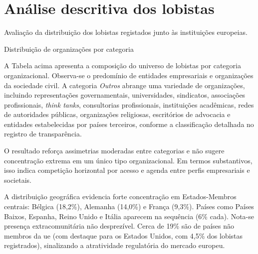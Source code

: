 \section{Análise descritiva dos lobistas}
\label{sec:resultados_descritica_lobistas}
Avaliação da distribuição dos lobistas registados junto às instituições europeias.

\begin{table}[!htbp]
\centering
\caption{Distribuição de organizações por categoria}

\end{table}

A Tabela acima apresenta a composição do universo de lobistas por categoria organizacional. Observa-se o predomínio de entidades empresariais e organizações da sociedade civil. A categoria \textit{Outros} abrange uma variedade de organizações, incluindo representações governamentais, universidades, sindicatos, associações profissionais, \textit{think tanks}, consultorias profissionais, instituições acadêmicas, redes de autoridades públicas, organizações religiosas, escritórios de advocacia e entidades estabelecidas por países terceiros, conforme a classificação detalhada no registro de transparência.

O resultado reforça assimetrias moderadas entre categorias e não sugere concentração extrema em um único tipo organizacional. Em termos substantivos, isso indica competição horizontal por acesso e agenda entre perfis empresariais e societais.

% 

A distribuição geográfica evidencia forte concentração em Estados-Membros centrais: Bélgica (18,2\%), Alemanha (14,0\%) e França (9,3\%). Países como Países Baixos, Espanha, Reino Unido e Itália aparecem na sequência (6\% cada). Nota-se presença extracomunitária não desprezível. Cerca de 19\% são de países não membros da \acrshort{ue} (com destaque para os Estados Unidos, com 4,5\% dos lobistas registrados), sinalizando a atratividade regulatória do mercado europeu.

